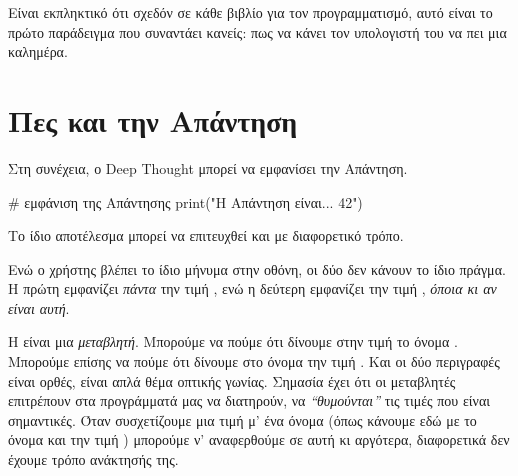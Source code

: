 \documentclass[a4paper,11pt,oneside]{book}
\begin{document}
Είναι εκπληκτικό ότι σχεδόν σε κάθε βιβλίο για τον προγραμματισμό, αυτό είναι το πρώτο παράδειγμα που συναντάει κανείς: πως να κάνει τον υπολογιστή του να πει μια καλημέρα.


\section{Πες και την Απάντηση}

Στη συνέχεια, ο Deep Thought μπορεί να εμφανίσει την Απάντηση.

\begin{pynew}
# εμφάνιση της Απάντησης
print("Η Απάντηση είναι... 42")
\end{pynew}

Το ίδιο αποτέλεσμα μπορεί να επιτευχθεί και με διαφορετικό τρόπο.


Ενώ ο χρήστης βλέπει το ίδιο μήνυμα στην οθόνη, οι δύο  δεν κάνουν το ίδιο πράγμα. Η πρώτη εμφανίζει \emph{πάντα} την τιμή , ενώ η δεύτερη εμφανίζει την τιμή , \emph{όποια κι αν είναι αυτή}.

Η  είναι μια \emph{μεταβλητή}. Μπορούμε να πούμε ότι δίνουμε στην τιμή  το όνομα . Μπορούμε επίσης να πούμε ότι δίνουμε στο όνομα  την τιμή . Και οι δύο περιγραφές είναι ορθές, είναι απλά θέμα οπτικής γωνίας. 
Σημασία έχει ότι οι μεταβλητές επιτρέπουν στα προγράμματά μας να διατηρούν, να \emph{``θυμούνται''} τις τιμές που είναι σημαντικές. Όταν συσχετίζουμε μια τιμή μ' ένα όνομα (όπως κάνουμε εδώ με το όνομα  και την τιμή ) μπορούμε ν' αναφερθούμε σε αυτή κι αργότερα, διαφορετικά δεν έχουμε τρόπο ανάκτησής της. 
\end{document}
